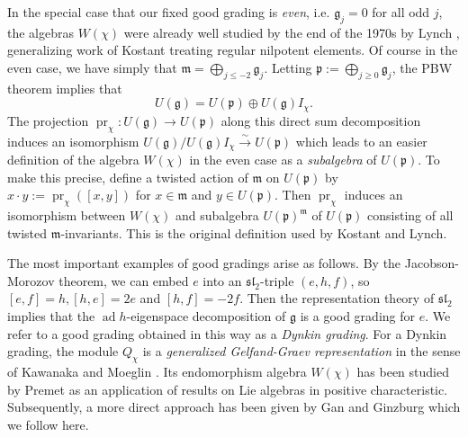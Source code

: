\documentclass[twoside,12pt,reqno]{amsart}
\def\pr{{\operatorname{pr}}}
\def\ad{\operatorname{ad}}
\begin{document}
In the special case that our fixed good grading is {\em even},
i.e. $\mathfrak{g}_j =0$ for all odd $j$,
the algebras $W(\chi)$
were already well studied 
by the end of the 1970s 
by Lynch \cite{Ly}, generalizing work of Kostant \cite{K}
treating regular nilpotent elements. 
Of course in the even case, we have simply that
$\mathfrak{m} = \bigoplus_{j \leq -2} \mathfrak{g}_j$.
Letting $\mathfrak{p} := \bigoplus_{j \geq 0} \mathfrak{g}_j$, the
PBW theorem implies that
\begin{equation*}
U(\mathfrak{g}) = U(\mathfrak{p}) \oplus U(\mathfrak{g}) I_\chi.
\end{equation*}
The projection $\pr_\chi:U(\mathfrak{g})
\rightarrow U(\mathfrak{p})$ along this direct sum decomposition
induces an isomorphism 
$U(\mathfrak{g}) / U(\mathfrak{g}) I_\chi 
\stackrel{\sim}{\rightarrow}
U(\mathfrak{p})$ 
which leads to an easier definition of the algebra
$W(\chi)$ in the even case as 
a {\em subalgebra} of $U(\mathfrak{p})$.
To make this precise, 
define a twisted action of $\mathfrak{m}$ on $U(\mathfrak{p})$
by $x \cdot y := \pr_\chi ([x,y])$ for $x \in \mathfrak{m}$
and $y \in U(\mathfrak{p})$. Then $\pr_\chi$ induces an isomorphism
between $W(\chi)$
and subalgebra $U(\mathfrak{p})^{\mathfrak{m}}$ of $U(\mathfrak{p})$
consisting of all twisted $\mathfrak{m}$-invariants. 
This is the original definition used
by Kostant and Lynch.

The most important examples of good gradings arise as follows.
By the Jacobson-Morozov theorem, we can embed $e$
into an $\mathfrak{sl}_2$-triple $(e,h,f)$, so
$[e,f] = h, [h,e] = 2e$ and $[h,f] = -2f$.
Then the representation theory of $\mathfrak{sl}_2$ implies that 
the $\ad h$-eigenspace decomposition of $\mathfrak{g}$
is a good grading for $e$. We refer to a good grading obtained in this
way as a {\em Dynkin grading}. For a Dynkin grading, the module
$Q_\chi$ is a {\em generalized Gelfand-Graev representation}
in the sense of Kawanaka \cite{Kaw} and Moeglin \cite{Moe}.
Its endomorphism algebra $W(\chi)$
has been studied by Premet \cite{P} as an application
of results on Lie algebras in positive characteristic.
Subsequently, a more direct approach has been
given by Gan and Ginzburg \cite{GG} which we follow here. 
\end{document}
